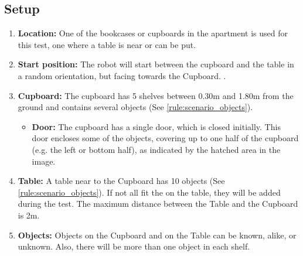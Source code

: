\begin{minipage}{0.70\textwidth}
	\subsection{Setup}
	\begin{enumerate}
		\item \textbf{Location:} One of the bookcases or cupboards in the apartment is used for this test, one where a table is near or can be put. 
		\item \textbf{Start position:} The robot will start between the cupboard and the table in a random orientation, but facing towards the Cupboard.
		. 
		\item \textbf{Cupboard:} The cupboard has 5 shelves between 0.30m and 1.80m from the ground and contains several objects (See \ref{rule:scenario_objects}).
		\begin{itemize}
		 	\item \textbf{Door:} The cupboard has a single door, which is closed initially.
		 	This door encloses some of the objects, covering up to one half of the cupboard (e.g. the left or bottom half), as indicated by the hatched area in the image.
		\end{itemize} 
		\item \textbf{Table:} A table near to the Cupboard has 10 objects (See \ref{rule:scenario_objects}). If not all fit the on the table, they will be added during the test. The maximum distance between the Table and the Cupboard is 2m.
		\item \textbf{Objects:} Objects on the Cupboard and on the Table can be known, alike, or unknown. Also, there will be more than one object in each shelf. 
	\end{enumerate}
\end{minipage}\hfill
